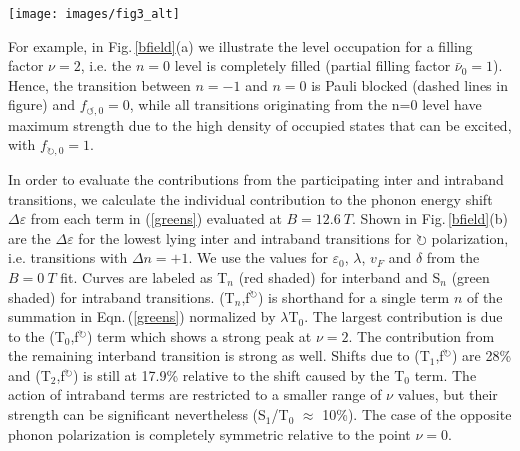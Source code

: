 \documentclass[prl,aps,superscriptaddress,showpacs,reprint]{revtex4-1}
\begin{document}
\begin{figure*}
\texttt{[image: images/fig3\_alt]}
\caption{\label{bfield} a)Schematic view of the Landau level spectrum at $B=12.6\: T$, filling factor $\nu=2$ and the lowest Landau level transitions participating in magneto-phonon coupling. Filled electronic states are highlighted using orange color. Red and blue arrows show transitions allowed by the selection rule $\Delta\left|n\right|= \pm 1$. Dashed arrows mark Pauli blocked transitions. Circular arrows represent the angular momentum involved in the transitions b) Relative strength and filling factor dependence of individual terms of the phonon self energy. Terms describing interband transitions are shaded red, intraband transitions are shaded green  c) Position of the graphene G-band during a gatesweep at $B=12.6\: T$. Vertical orange lines mark specific filling factors at $\nu=-6,-2,0,2,6$ where the n=-1,0,1 levels are completely filled/depleted with charge carriers ($\nu=0$ - half filling of n=0 level). The calculated magneto-phonon energies according to equation \ref{greens} are plotted as solid red($\Delta n = +1$) and solid blue($\Delta n = -1$) lines. Dashed lines include $\Delta n = 0$ transitions.}
\end{figure*}

For example, in Fig.\,\ref{bfield}(a) we illustrate the level occupation for a filling factor $\nu=2$, i.e. the $n=0$ level is completely filled (partial filling factor $\bar{\nu}_0=1$). Hence,  the transition between $n=-1$ and $ n=0$ is Pauli blocked (dashed lines in figure) and  $f_{\circlearrowleft,0}=0$, while all transitions originating from the n=0 level have maximum strength due to the high density of occupied states that can be excited, with $f_{\circlearrowright,0}=1$.

In order to evaluate the contributions from  the participating inter and intraband transitions, we calculate the individual contribution to the phonon energy shift $\Delta\varepsilon$ from each term in (\ref{greens}) evaluated at $B=12.6\: T$. Shown in Fig.\,\ref{bfield}(b) are the $\Delta\varepsilon$ for the lowest lying inter and intraband transitions for $\circlearrowright$ polarization, i.e. transitions with $\Delta n =+1$. We use the values for $\varepsilon_0$, $\lambda$, $v_F$ and $\delta$ from the $B=0\: T$ fit. Curves are labeled as T$_n$ (red shaded) for interband and S$_n$ (green shaded) for intraband transitions. (T$_n$,f$^\circlearrowright$) is shorthand for a single term $n$ of the summation in Eqn.\,(\ref{greens}) normalized by $\lambda$T$_0$. The largest contribution is due to the (T$_0$,f$^\circlearrowright$) term which shows a strong peak at $\nu=2$. The contribution from the remaining interband transition is strong as well. Shifts due to (T$_1$,f$^\circlearrowright$) are 28\% and (T$_2$,f$^\circlearrowright$) is still at 17.9\% relative to the shift caused by the T$_0$ term.
The action of intraband terms are restricted to a smaller range of $\nu$ values, but their strength can be significant nevertheless (S$_1$/T$_0$ $\approx$ 10\%). The case of the opposite phonon polarization is completely symmetric relative to the point $\nu = 0$.
\end{document}
